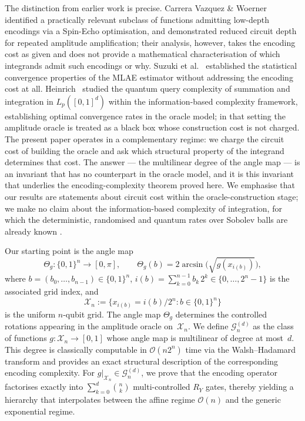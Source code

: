 \documentclass[12pt,a4paper]{article}
\theoremstyle{plain}
\theoremstyle{definition}
\theoremstyle{remark}
\newcommand{\Ry}{R_Y}
\begin{document}
The distinction from earlier work is precise.
Carrera Vazquez \& Woerner~\cite{CarreraVazquezWoerner2020} identified
a practically relevant subclass of functions admitting low-depth
encodings via a Spin-Echo optimisation, and demonstrated reduced circuit
depth for repeated amplitude amplification; their analysis, however,
takes the encoding cost as given and does not provide a mathematical
characterisation of which integrands admit such encodings or why.
Suzuki et al.~\cite{SuzukiEtAl2019} established the statistical
convergence properties of the MLAE estimator without addressing the
encoding cost at all.
Heinrich~\cite{Heinrich2002} studied the quantum query complexity of
summation and integration in $L_p([0,1]^d)$ within the
information-based complexity framework, establishing optimal convergence
rates in the oracle model; in that setting the amplitude oracle is
treated as a black box whose construction cost is not charged.
The present paper operates in a complementary regime: we charge the
circuit cost of building the oracle and ask which structural property of
the integrand determines that cost.
The answer --- the multilinear degree of the angle map --- is an
invariant that has no counterpart in the oracle model, and it is this
invariant that underlies the encoding-complexity theorem proved here.
We emphasise that our results are statements about circuit cost within
the oracle-construction stage; we make no claim about the
information-based complexity of integration, for which the
deterministic, randomised and quantum rates over Sobolev balls are
already known \cite{Novak2001,Heinrich2002,Heinrich2003}.

Our starting point is the angle map
\[
\Theta_g : \{0,1\}^n \to [0,\pi], \qquad
\Theta_g(b)=2\arcsin\!\bigl(\sqrt{g(x_{i(b)})}\bigr),
\]
where $b=(b_0,\ldots,b_{n-1})\in\{0,1\}^n$,
$i(b) = \sum_{k=0}^{n-1} b_k\,2^k \in \{0,\ldots,2^n-1\}$
is the associated grid index, and
\[
  \mathcal{X}_n := \bigl\{x_{i(b)} = i(b)/2^n : b \in \{0,1\}^n\bigr\}
\]
is the uniform $n$-qubit grid.
The angle map $\Theta_g$ determines the controlled rotations appearing
in the amplitude oracle on~$\mathcal{X}_n$.
We define $\mathcal{G}_n^{(d)}$ as the class of functions
$g:\mathcal{X}_n\to[0,1]$ whose angle map is multilinear of degree at
most~$d$.
This degree is classically computable in $\mathcal{O}(n2^n)$ time via
the Walsh--Hadamard transform and provides an exact structural
description of the corresponding encoding complexity.
For $g|_{\mathcal{X}_n} \in \mathcal{G}_n^{(d)}$, we prove that the
encoding operator factorises exactly into $\sum_{k=0}^d \binom{n}{k}$
multi-controlled $\Ry$ gates, thereby yielding a hierarchy that
interpolates between the affine regime $\mathcal{O}(n)$ and the generic
exponential regime.
\end{document}
